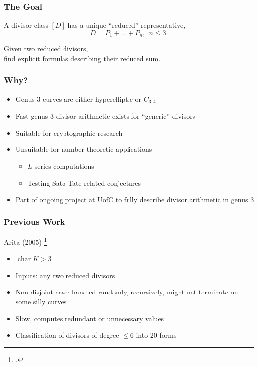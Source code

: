 \documentclass{beamer}
\DeclareMathOperator{\Char}{char}
\begin{document}

\begin{frame}
\frametitle{The Goal}
  \begin{center}
    A divisor class $[D]$ has a unique ``reduced'' representative,
    \[ D = P_1 + \ldots + P_n, ~~ n \leq 3. \]
  \end{center}
  \vspace{10pt}
  \begin{center}
    Given two reduced divisors,\\
    find explicit formulas describing their reduced sum.
  \end{center}
\end{frame}


\begin{frame}
\frametitle{Why?}
  \begin{itemize}
    \item Genus 3 curves are either hyperelliptic or $C_{3,4}$
    \item Fast genus 3 divisor arithmetic exists for ``generic'' divisors
    \item Suitable for cryptographic research
    \item Unsuitable for number theoretic applications
    \begin{itemize}
      \item $L$-series computations
      \item Testing Sato-Tate-related conjectures
    \end{itemize}
    \item Part of ongoing project at UofC to fully describe divisor arithmetic in genus 3
  \end{itemize}
\end{frame}


\begin{frame}
\frametitle{Previous Work}
  Arita (2005) \footcite{arita05-2}
  \begin{itemize}
    \item $\Char K > 3$
    \item Inputs: any two reduced divisors
    \item Non-disjoint case: handled randomly, recursively, might not terminate on some silly curves
    \item Slow, computes redundant or unnecessary values
    \item Classification of divisors of degree $\leq 6$ into 20 forms
  \end{itemize}
\end{frame}
\end{document}
